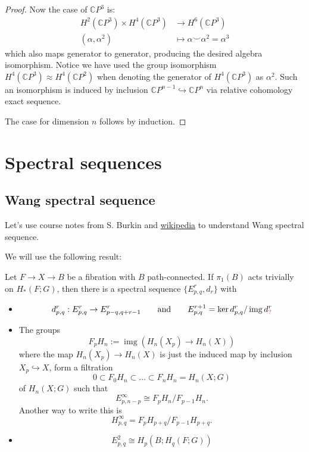 \documentclass{article}
\numberwithin{equation}{section}
\newcommand{\C}{\mathbb{C}}
\DeclareMathOperator{\img}{img}
\begin{document}
\begin{proof}
	Now the case of $\C P^3$ is:
	\begin{align*}
		H^2(\C P^3)\times H^4(\C P^3)&\to H^6(\C P^3)\\
		(\alpha,\alpha^2)\qquad\quad&\mapsto\alpha\smile\alpha^2=\alpha^3
	\end{align*}
	which also  maps generator to generator, producing the desired algebra isomorphism. Notice we have used the group isomorphism $H^4(\C P^3)\approx H^4(\C P^2)$ when denoting the generator of $H^4(\C P^3)$ as $\alpha^2$. Such an isomorphism is induced by inclusion $\C P^{n-1}\hookrightarrow\C P^n$ via relative cohomology exact sequence.
	
	The case for dimension $n$ follows by induction.
\end{proof}

\section{Spectral sequences}\label{sec:spectral sequences}
\subsection{Wang spectral sequence}\label{ssec:Wang spectral sequence}

Let's use course notes from S. Burkin and \href{https://en.wikipedia.org/wiki/Spectral_sequence#Wang_sequence}{wikipedia} to understand Wang spectral sequence.

We will use the following result:

\begin{thm}
	Let $F\to X\to B$ be a fibration with $B$ path-connected. If $\pi_1(B)$ acts trivially on $H_*(F;G)$, then there is a spectral sequence $\{E^r_{p,q},d_r\}$ with
	\begin{itemize}
		\item
			\[d^r_{p,q}:E^r_{p,q}\to E^r_{p-q,q+r-1}\qquad \text{and} \qquad E^{r+1}_{p,q}=\ker d^r_{p,q}/\img d^r_{{\color{magenta}?}}\]
		\item The groups
			\[F_pH_n:=\img(H_n(X_p)\to H_n(X))\]
		where the map $H_{n}(X_p)\to H_{n}(X)$ is just the induced map by inclusion $X_p\hookrightarrow X$, form a filtration
		\[0\subset F_0H_n\subset \ldots\subset F_nH_n=H_n(X;G)\]
		of $H_n(X;G)$ such that
		\[E^\infty_{p,n-p}\cong F_pH_n/F_{p-1}H_n.\]
		Another way to write this is
		\[H_{p,q}^\infty=F_pH_{p+q}\Big/F_{p-1}H_{p+q}.\]
	\item \[E^2_{p,q}\cong H_p(B;H_q(F;G))\]
\end{itemize}
\end{thm}
\end{document}
